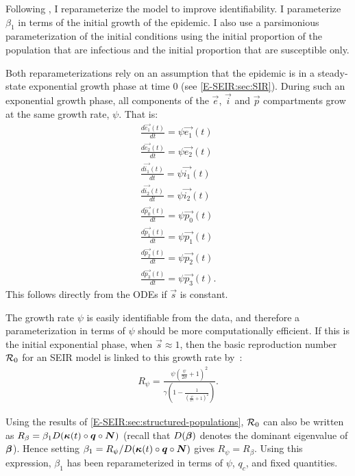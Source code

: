 \documentclass[thesis.tex]{subfiles}
\begin{document}
Following \textcite{birrellBayesian}, I reparameterize the model to improve identifiability.
I parameterize $\beta_1$ in terms of the initial growth of the epidemic.
I also use a parsimonious parameterization of the initial conditions using the initial proportion of the population that are infectious and the initial proportion that are susceptible only.

Both reparameterizations rely on an assumption that the epidemic is in a steady-state exponential growth phase at time 0 (see \cref{E-SEIR:sec:SIR}). During such an exponential growth phase, all components of the $\vec{e}$, $\vec{i}$ and $\vec{p}$ compartments grow at the same growth rate, $\psi$.
That is:
\begin{equation}
\begin{aligned}
\frac{d\vec{e_1}(t)}{dt} = \psi \vec{e_1}(t) \\
\frac{d\vec{e_2}(t)}{dt} = \psi \vec{e_2}(t) \\
\frac{d\vec{i_1}(t)}{dt} = \psi \vec{i_1}(t) \\
\frac{d\vec{i_2}(t)}{dt} = \psi \vec{i_2}(t) \\
\frac{d\vec{p_0}(t)}{dt} = \psi \vec{p_0}(t) \\
\frac{d\vec{p_1}(t)}{dt} = \psi \vec{p_1}(t) \\
\frac{d\vec{p_2}(t)}{dt} = \psi \vec{p_2}(t) \\
\frac{d\vec{p_3}(t)}{dt} = \psi \vec{p_3}(t).
\end{aligned}
\label{SEIR:eq:exponential-growth}
\end{equation}
This follows directly from the ODEs if $\vec{s}$ is constant. 

The growth rate $\psi$ is easily identifiable from the data, and therefore a parameterization in terms of $\psi$ should be more computationally efficient.
If this is the initial exponential phase, when $\vec{s} \approx 1$, then the basic reproduction number $\mathcal{R}_{0}$ for an SEIR model is linked to this growth rate by~\autocite{birrellBayesian,wearingAppropriate}:
\begin{align}
    R_{\psi} = \frac{\psi \left( \frac{\psi}{2\sigma} + 1 \right)^2}{\gamma \left(1 - \frac{1}{\left(\frac{\psi}{2 \gamma} + 1 \right)^2} \right)} \label{SEIR:eq:rtoR}.
\end{align}

Using the results of \cref{E-SEIR:sec:structured-populations}, $\mathcal{R}_{0}$ can also be written as $R_{\beta} = \beta_1 D(\bm{\kappa}(t) \circ \bm{q} \circ \bm{N})$ (recall that $D(\bm{\beta})$ denotes the dominant eigenvalue of $\bm{\beta}$).
Hence setting $\beta_1 = R_\psi / D(\bm{\kappa}(t) \circ \bm{q} \circ \bm{N})$ gives $R_\psi = R_\beta$.
Using this expression, $\beta_1$ has been reparameterized in terms of $\psi$, $q_c$, and fixed quantities.
\end{document}
